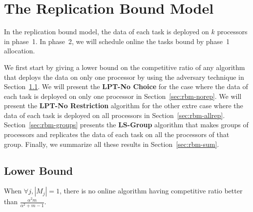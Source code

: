 \documentclass[twocolumn]{svjour3}
\begin{document}
\section{The Replication Bound Model}

In the replication bound model, the data of each task is deployed on
$k$ processors in phase~1. In phase~2, we will schedule online the
tasks bound by phase~1 allocation.

We first start by giving a lower bound on the competitive ratio of any
algorithm that deploys the data on only one processor by using the
adversary technique in Section~\ref{sec:rbmlb}. We will present the
{\bf LPT-No Choice} for the case where the data of each task is
deployed on only one processor in Section~\ref{sec:rbm-norep}. We will
present the {\bf LPT-No Restriction} algorithm for the other extre
case where the data of each task is deployed on all processors in
Section~\ref{sec:rbm-allrep}. Section~\ref{sec:rbm-groups} presents
the {\bf LS-Group} algorithm that makes groups of processors and
replicates the data of each task on all the processors of that
group. Finally, we summarize all these results in
Section~\ref{sec:rbm-sum}.

\subsection{Lower Bound}
\label{sec:rbmlb}

\begin{theorem}
\label{th:model1-lb}
When $\forall j, |M_j| = 1$, there is no online algorithm having
competitive ratio better than $\frac{\alpha^{2}m }{\alpha^{2} + m-1}$.
\end{theorem}
 
\end{document}
